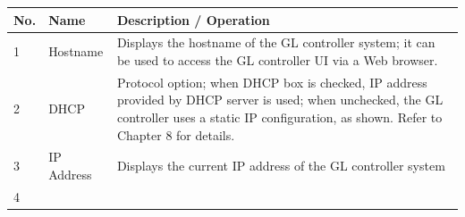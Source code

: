 \begin{longtable}[]{@{}lll@{}}
\toprule
\begin{minipage}[b]{0.12\columnwidth}\raggedright
No.\strut
\end{minipage} & \begin{minipage}[b]{0.24\columnwidth}\raggedright
Name\strut
\end{minipage} & \begin{minipage}[b]{0.55\columnwidth}\raggedright
Description / Operation\strut
\end{minipage}\tabularnewline
\midrule
\endhead
\begin{minipage}[t]{0.12\columnwidth}\raggedright
1\strut
\end{minipage} & \begin{minipage}[t]{0.24\columnwidth}\raggedright
Hostname\strut
\end{minipage} & \begin{minipage}[t]{0.55\columnwidth}\raggedright
Displays the hostname of the GL controller system; it can be used to
access the GL controller UI via a Web browser.\strut
\end{minipage}\tabularnewline
\begin{minipage}[t]{0.12\columnwidth}\raggedright
2\strut
\end{minipage} & \begin{minipage}[t]{0.24\columnwidth}\raggedright
DHCP\strut
\end{minipage} & \begin{minipage}[t]{0.55\columnwidth}\raggedright
Protocol option; when DHCP box is checked, IP address provided by DHCP
server is used; when unchecked, the GL controller uses a static IP
configuration, as shown. Refer to Chapter 8 for details.\strut
\end{minipage}\tabularnewline
\begin{minipage}[t]{0.12\columnwidth}\raggedright
3\strut
\end{minipage} & \begin{minipage}[t]{0.24\columnwidth}\raggedright
IP Address\strut
\end{minipage} & \begin{minipage}[t]{0.55\columnwidth}\raggedright
Displays the current IP address of the GL controller system\strut
\end{minipage}\tabularnewline
\begin{minipage}[t]{0.12\columnwidth}\raggedright
4\strut
\end{minipage} & \begin{minipage}[t]{0.24\columnwidth}\raggedright

\end{minipage}
\end{longtable}
